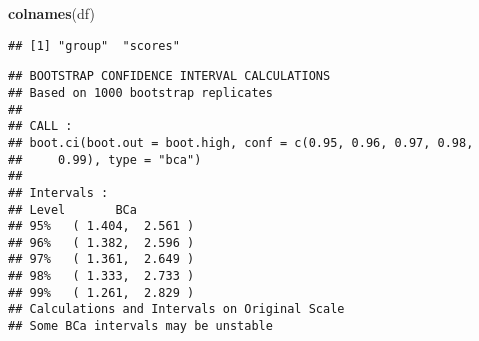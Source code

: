 \documentclass[
]{article}
\newenvironment{Shaded}{\begin{snugshade}}{\end{snugshade}}
\newcommand{\AttributeTok}[1]{\textcolor[rgb]{0.13,0.29,0.53}{#1}}
\newcommand{\ConstantTok}[1]{\textcolor[rgb]{0.56,0.35,0.01}{#1}}
\newcommand{\ControlFlowTok}[1]{\textcolor[rgb]{0.13,0.29,0.53}{\textbf{#1}}}
\newcommand{\DecValTok}[1]{\textcolor[rgb]{0.00,0.00,0.81}{#1}}
\newcommand{\FloatTok}[1]{\textcolor[rgb]{0.00,0.00,0.81}{#1}}
\newcommand{\FunctionTok}[1]{\textcolor[rgb]{0.13,0.29,0.53}{\textbf{#1}}}
\newcommand{\NormalTok}[1]{#1}
\newcommand{\OtherTok}[1]{\textcolor[rgb]{0.56,0.35,0.01}{#1}}
\newcommand{\SpecialCharTok}[1]{\textcolor[rgb]{0.81,0.36,0.00}{\textbf{#1}}}
\newcommand{\StringTok}[1]{\textcolor[rgb]{0.31,0.60,0.02}{#1}}
\begin{document}
\begin{Shaded}
\begin{Highlighting}[]
\FunctionTok{colnames}\NormalTok{(df)}
\end{Highlighting}
\end{Shaded}

\begin{verbatim}
## [1] "group"  "scores"
\end{verbatim}

\begin{Shaded}
\end{Shaded}

\begin{verbatim}
## BOOTSTRAP CONFIDENCE INTERVAL CALCULATIONS
## Based on 1000 bootstrap replicates
## 
## CALL : 
## boot.ci(boot.out = boot.high, conf = c(0.95, 0.96, 0.97, 0.98, 
##     0.99), type = "bca")
## 
## Intervals : 
## Level       BCa          
## 95%   ( 1.404,  2.561 )   
## 96%   ( 1.382,  2.596 )   
## 97%   ( 1.361,  2.649 )   
## 98%   ( 1.333,  2.733 )   
## 99%   ( 1.261,  2.829 )  
## Calculations and Intervals on Original Scale
## Some BCa intervals may be unstable
\end{verbatim}
\end{document}

